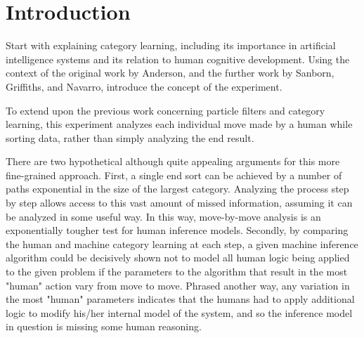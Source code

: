 \section*{Introduction}

Start with explaining category learning, including its importance in artificial
intelligence systems and its relation to human cognitive development. Using the
context of the original work by Anderson, and the further work by Sanborn,
Griffiths, and Navarro, introduce the concept of the experiment.

To extend upon the previous work concerning particle filters and category learning, this experiment analyzes each individual move made by a human while sorting data, rather than simply analyzing the end result.

There are two hypothetical although quite appealing arguments for this more fine-grained approach. First, a single end sort can be achieved by a number of paths exponential in the size of the largest category. Analyzing the process step by step allows access to this vast amount of missed information, assuming it can be analyzed in some useful way. In this way, move-by-move analysis is an exponentially tougher test for human inference models. Secondly, by comparing the human and machine category learning at each step, a given machine inference algorithm could be decisively shown not to model all human logic being applied to the given problem if the parameters to the algorithm that result in the most "human" action vary from move to move. Phrased another way, any variation in the most "human" parameters indicates that the humans had to apply additional logic to modify his/her internal model of the system, and so the inference model in question is missing some human reasoning.
